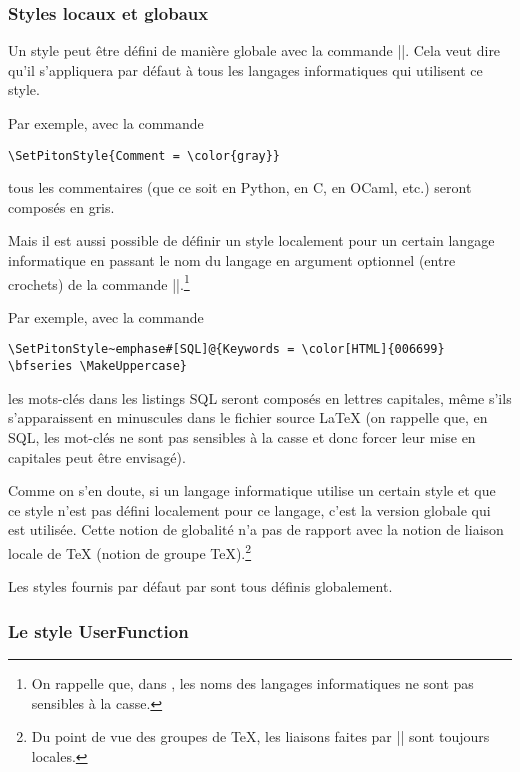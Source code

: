 \documentclass[dvipsnames,svgnames]{article}
\begin{document}
\subsubsection{Styles locaux et globaux}

Un style peut être défini de manière globale avec la commande |\SetPitonStyle|. Cela veut dire qu'il s'appliquera
par défaut à tous les langages informatiques qui utilisent ce style.

\medskip
Par exemple, avec la commande 
\begin{Verbatim}
\SetPitonStyle{Comment = \color{gray}}
\end{Verbatim}
tous les commentaires (que ce soit en Python, en C, en OCaml, etc.) seront composés en gris.

\bigskip
Mais il est aussi possible de définir un style localement pour un certain langage informatique en passant le nom du
langage en argument optionnel (entre crochets) de la commande |\SetPitonStyle|.\footnote{On rappelle que, dans
  , les noms des langages informatiques ne sont pas sensibles à la casse.}

\medskip
Par exemple, avec la commande 
\begin{Verbatim}
\SetPitonStyle~emphase#[SQL]@{Keywords = \color[HTML]{006699} \bfseries \MakeUppercase}
\end{Verbatim}
les mots-clés dans les listings SQL seront composés en lettres capitales, même s'ils s'apparaissent en minuscules
dans le fichier source LaTeX (on rappelle que, en SQL, les mot-clés ne sont pas sensibles à la casse et donc forcer
leur mise en capitales peut être envisagé).

\medskip
Comme on s'en doute, si un langage informatique utilise un certain style et que ce style n'est pas défini
localement pour ce langage, c'est la version globale qui est utilisée. Cette notion de globalité n'a pas de
rapport avec la notion de liaison locale de TeX (notion de groupe TeX).\footnote{Du point de vue des groupes de
  TeX, les liaisons faites par |\SetPitonStyle| sont toujours locales.}

\medskip
Les styles fournis par défaut par  sont tous définis globalement.

\bigskip
\subsubsection{Le style UserFunction}

\end{document}
